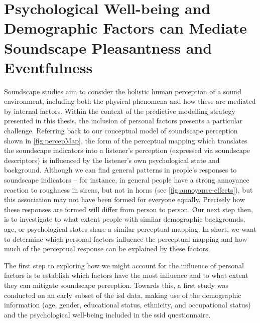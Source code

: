 \chapter{Psychological Well-being and Demographic Factors can Mediate Soundscape Pleasantness and Eventfulness}
\label{ch:whostudy}

Soundscape studies aim to consider the holistic human perception of a sound environment, including both the physical phenomena and how these are mediated by internal factors. Within the context of the predictive modelling strategy presented in this thesis, the inclusion of personal factors presents a particular challenge. Referring back to our conceptual model of soundscape perception shown in \cref{fig:percepMap}, the form of the perceptual mapping which translates the soundscape indicators into a listener's perception (expressed via soundscape descriptors) is influenced by the listener's own psychological state and background. Although we can find general patterns in people's responses to soundscape indicators -- for instance, in general people have a strong annoyance reaction to roughness in sirens, but not in horns (see \cref{fig:annoyance-effects}), but this association may not have been formed for everyone equally. Precisely how these responses are formed will differ from person to person. Our next step then, is to investigate to what extent people with similar demographic backgrounds, age, or psychological states share a similar perceptual mapping. In short, we want to determine which personal factors influence the perceptual mapping and how much of the perceptual response can be explained by these factors.

The first step to exploring how we might account for the influence of personal factors is to establish which factors have the most influence and to what extent they can mitigate soundscape perception. Towards this, a first study was conducted on an early subset of the \gls{isd} data, making use of the demographic information (age, gender, educational status, ethnicity, and occupational status) and the psychological well-being included in the \gls{ssid} questionnaire.


